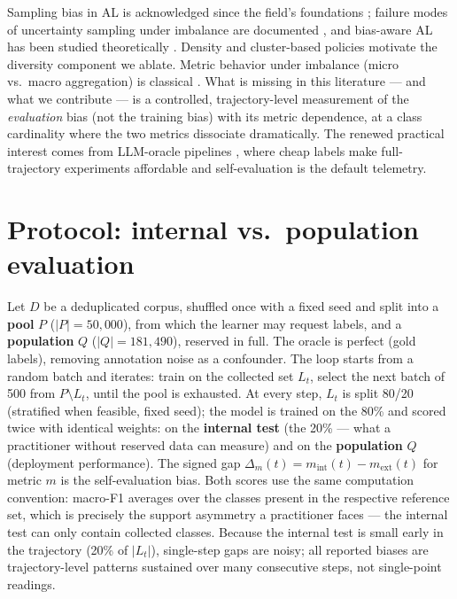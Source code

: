 \documentclass[11pt]{article}
\begin{document}
Sampling bias in AL is acknowledged since the field's foundations
\citep{Settles2012}; failure modes of uncertainty sampling under imbalance
are documented \citep{Attenberg2010}, and bias-aware AL has been studied
theoretically \citep{Santos2016Vies}. Density and cluster-based policies
\citep{Settles2008,Nguyen2004,Dasgupta2008} motivate the diversity
component we ablate. Metric behavior under imbalance (micro vs.\ macro
aggregation) is classical \citep{Sokolova2009}. What is missing in this
literature --- and what we contribute --- is a controlled, trajectory-level
measurement of the \emph{evaluation} bias (not the training bias) with its
metric dependence, at a class cardinality where the two metrics dissociate
dramatically. The renewed practical interest comes from LLM-oracle
pipelines \citep{Gilardi2023,Bayer2024}, where cheap labels make
full-trajectory experiments affordable and self-evaluation is the default
telemetry.

\section{Protocol: internal vs.\ population evaluation}
\label{sec:protocol}

Let $D$ be a deduplicated corpus, shuffled once with a fixed seed and split
into a \textbf{pool} $P$ ($|P|=50{,}000$), from which the learner may
request labels, and a \textbf{population} $Q$ ($|Q|=181{,}490$), reserved
in full. The oracle is perfect (gold labels), removing annotation noise as
a confounder. The loop starts from a random batch and iterates: train on
the collected set $L_t$, select the next batch of 500 from $P \setminus
L_t$, until the pool is exhausted. At every step, $L_t$ is split 80/20
(stratified when feasible, fixed seed); the model is trained on the 80\%
and scored twice with identical weights: on the \textbf{internal test}
(the 20\% --- what a practitioner without reserved data can measure) and on
the \textbf{population} $Q$ (deployment performance). The signed gap
$\Delta_m(t) = m_{\text{int}}(t) - m_{\text{ext}}(t)$ for metric $m$ is the
self-evaluation bias. Both scores use the same computation convention:
macro-F1 averages over the classes present in the respective reference
set, which is precisely the support asymmetry a practitioner faces ---
the internal test can only contain collected classes. Because the
internal test is small early in the trajectory (20\% of $|L_t|$),
single-step gaps are noisy; all reported biases are trajectory-level
patterns sustained over many consecutive steps, not single-point
readings.
\end{document}
